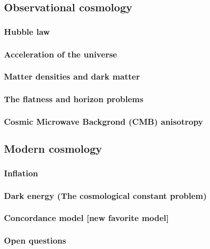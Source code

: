 \documentclass{article}
\theoremstyle{definition}
\begin{document}
\subsection{Observational cosmology}
\subsubsection{Hubble law}
\subsubsection{Acceleration of the universe}
\subsubsection{Matter densities and dark matter}
\subsubsection{The flatness and horizon problems}
\subsubsection{Cosmic Microwave Backgrond (CMB) anisotropy}
\subsection{Modern cosmology}
\subsubsection{Inflation}
\subsubsection{Dark energy (The cosmological constant problem)}
\subsubsection{Concordance model [new favorite model]}
\subsubsection{Open questions}

\newpage
 
\end{document}
